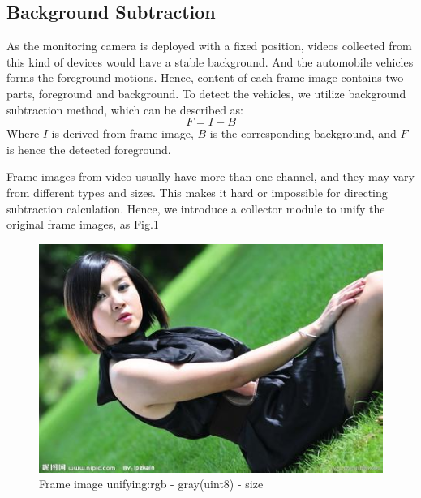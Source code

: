 \documentclass[conference]{IEEEtran}
\begin{document}
	
	\subsection{Background Subtraction}
	As the monitoring camera is deployed with a fixed position, videos collected from this kind of devices would have a stable background. And the automobile vehicles forms the foreground motions. Hence, content of each frame image contains two parts, foreground and background. To detect the vehicles, we utilize background subtraction method, which can be described as:
	\begin{equation}
	F = I  - B
	\label{eq:backgroundSubtraction}
	\end{equation}
	Where $I$ is derived from frame image, $B$ is the corresponding background, and $F$ is hence the detected foreground.
	
	Frame images from video usually have more than one channel, and they may vary from different types and sizes. This makes it hard or impossible for directing subtraction calculation. Hence, we introduce a collector module to unify the original frame images, as Fig.\ref{fig:unifyDiagram}
	\begin{figure}[!h]
	\centering
	\includegraphics[width=1\linewidth]{figures/jena.jpg} 
	\caption{Frame image unifying:rgb - gray(uint8) - size}
	\label{fig:unifyDiagram}
	\end{figure}
	
\end{document}

